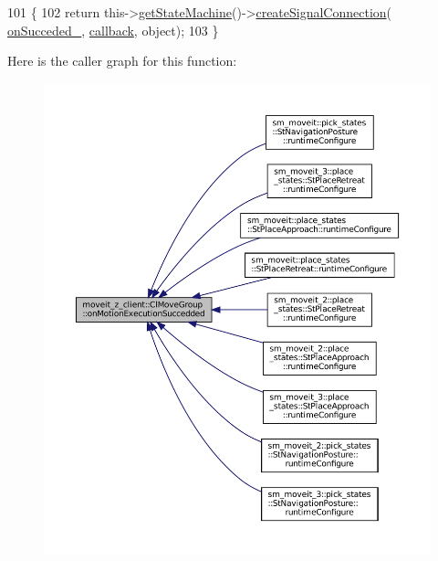 \begin{DoxyCode}
101   \{
102     \textcolor{keywordflow}{return} this->\hyperlink{classsmacc_1_1ISmaccClient_aec51d4712404cb9882b86e4c854bb93a}{getStateMachine}()->\hyperlink{classsmacc_1_1ISmaccStateMachine_adf0f42ade0c65cc471960fe2a7c42da2}{createSignalConnection}(
      \hyperlink{classmoveit__z__client_1_1ClMoveGroup_a77804970cc1e2ae64e26dabbf556352d}{onSucceded\_}, \hyperlink{servers_2opencv__perception__node_2opencv__perception__node_8cpp_a050e697bd654facce10ea3f6549669b3}{callback}, \textcolor{keywordtype}{object});
103   \}
\end{DoxyCode}
Here is the caller graph for this function\+:
\nopagebreak
\begin{figure}[H]
\begin{center}
\leavevmode
\includegraphics[width=350pt]{classmoveit__z__client_1_1ClMoveGroup_a4c3a7340e1e52015ccd61a94dba152c0_icgraph}
\end{center}
\end{figure}
\mbox{\label{classmoveit__z__client_1_1ClMoveGroup_a42bede73264ae2d5dfe0117315042acb}} 
